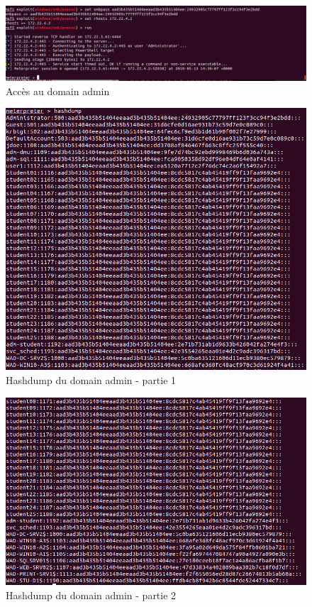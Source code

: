 \documentclass[12pt]{report} %
\begin{document}
\begin{figure}[!h]
	\includegraphics[width=17cm]{3_5_loginSMB_172_22_4_2.PNG}
	\caption*{Accès au domain admin}
\end{figure}

\begin{figure}[!h]
	\includegraphics[width=17cm]{hashdump_3_5_1_sur_2.PNG}
	\caption*{Hashdump du domain admin - partie 1}
\end{figure}

\begin{figure}[!h]
	\includegraphics[width=17cm]{hashdump_3_5_2_sur_2.PNG}
	\caption*{Hashdump du domain admin - partie 2}
\end{figure}
\end{document}
